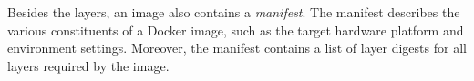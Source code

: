 %
%
%





%
%
%
%
%
%
%
%

%
Besides the layers, an image also contains a \emph{manifest}.
The manifest describes the various constituents of a Docker image, such as the
target hardware platform and environment settings.
%
Moreover, the manifest contains a list of layer digests for all layers required by the image.
%
%
%

